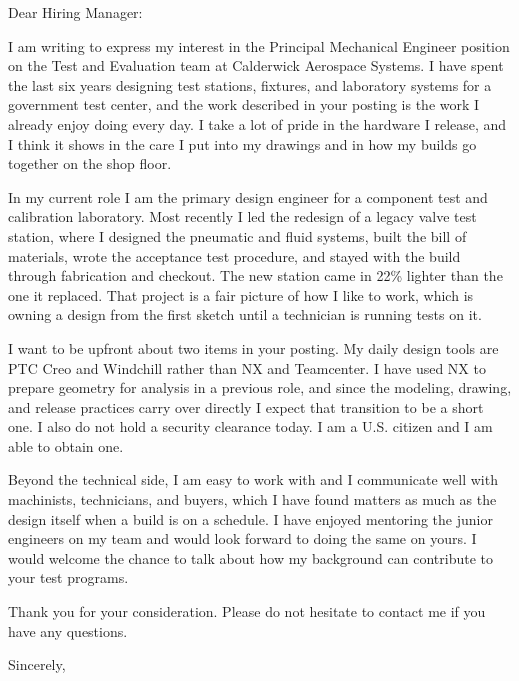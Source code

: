 \documentclass{coverletter}
\begin{document}
\makeheader
\opening{Dear Hiring Manager:}

I am writing to express my interest in the Principal Mechanical Engineer position on the Test and Evaluation team at Calderwick Aerospace Systems. I have spent the last six years designing test stations, fixtures, and laboratory systems for a government test center, and the work described in your posting is the work I already enjoy doing every day. I take a lot of pride in the hardware I release, and I think it shows in the care I put into my drawings and in how my builds go together on the shop floor.

In my current role I am the primary design engineer for a component test and calibration laboratory. Most recently I led the redesign of a legacy valve test station, where I designed the pneumatic and fluid systems, built the bill of materials, wrote the acceptance test procedure, and stayed with the build through fabrication and checkout. The new station came in 22\% lighter than the one it replaced. That project is a fair picture of how I like to work, which is owning a design from the first sketch until a technician is running tests on it.

I want to be upfront about two items in your posting. My daily design tools are PTC Creo and Windchill rather than NX and Teamcenter. I have used NX to prepare geometry for analysis in a previous role, and since the modeling, drawing, and release practices carry over directly I expect that transition to be a short one. I also do not hold a security clearance today. I am a U.S. citizen and I am able to obtain one.

Beyond the technical side, I am easy to work with and I communicate well with machinists, technicians, and buyers, which I have found matters as much as the design itself when a build is on a schedule. I have enjoyed mentoring the junior engineers on my team and would look forward to doing the same on yours. I would welcome the chance to talk about how my background can contribute to your test programs.

Thank you for your consideration. Please do not hesitate to contact me if you have any questions.

\closing{Sincerely,}
\end{document}
